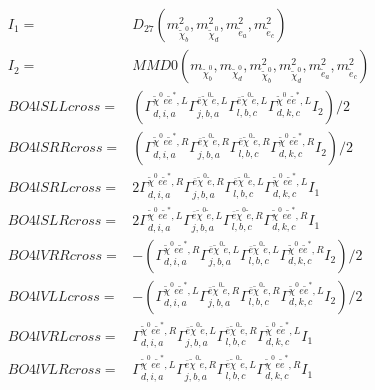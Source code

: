 \documentclass[A4,landscape]{article}
\begin{document}
\begin{align} 
I_1 = & D_{27}(m^2_{\tilde{\chi}^0_{{b}}}, m^2_{\tilde{\chi}^0_{{d}}}, m^2_{\tilde{e}_{{a}}}, m^2_{\tilde{e}_{{c}}}) \\ 
I_2 = & MMD0(m_{\tilde{\chi}^0_{{b}}}, m_{\tilde{\chi}^0_{{d}}}, m^2_{\tilde{\chi}^0_{{b}}}, m^2_{\tilde{\chi}^0_{{d}}}, m^2_{\tilde{e}_{{a}}}, m^2_{\tilde{e}_{{c}}}) \\ 
  BO4lSLLcross= & ( \Gamma^{\tilde{\chi}^0 e \tilde{e}^*,L}_{d, i, a} \Gamma^{\bar{e}\tilde{\chi}^0 \tilde{e} ,L}_{j, b, a} \Gamma^{\bar{e}\tilde{\chi}^0 \tilde{e} ,L}_{l, b, c} \Gamma^{\tilde{\chi}^0 e \tilde{e}^*,L}_{d, k, c} I_2)/2 \\ 
  BO4lSRRcross= & ( \Gamma^{\tilde{\chi}^0 e \tilde{e}^*,R}_{d, i, a} \Gamma^{\bar{e}\tilde{\chi}^0 \tilde{e} ,R}_{j, b, a} \Gamma^{\bar{e}\tilde{\chi}^0 \tilde{e} ,R}_{l, b, c} \Gamma^{\tilde{\chi}^0 e \tilde{e}^*,R}_{d, k, c} I_2)/2 \\ 
  BO4lSRLcross= & 2  \Gamma^{\tilde{\chi}^0 e \tilde{e}^*,R}_{d, i, a} \Gamma^{\bar{e}\tilde{\chi}^0 \tilde{e} ,R}_{j, b, a} \Gamma^{\bar{e}\tilde{\chi}^0 \tilde{e} ,L}_{l, b, c} \Gamma^{\tilde{\chi}^0 e \tilde{e}^*,L}_{d, k, c} I_1 \\ 
  BO4lSLRcross= & 2  \Gamma^{\tilde{\chi}^0 e \tilde{e}^*,L}_{d, i, a} \Gamma^{\bar{e}\tilde{\chi}^0 \tilde{e} ,L}_{j, b, a} \Gamma^{\bar{e}\tilde{\chi}^0 \tilde{e} ,R}_{l, b, c} \Gamma^{\tilde{\chi}^0 e \tilde{e}^*,R}_{d, k, c} I_1 \\ 
  BO4lVRRcross= & -( \Gamma^{\tilde{\chi}^0 e \tilde{e}^*,R}_{d, i, a} \Gamma^{\bar{e}\tilde{\chi}^0 \tilde{e} ,L}_{j, b, a} \Gamma^{\bar{e}\tilde{\chi}^0 \tilde{e} ,L}_{l, b, c} \Gamma^{\tilde{\chi}^0 e \tilde{e}^*,R}_{d, k, c} I_2)/2 \\ 
  BO4lVLLcross= & -( \Gamma^{\tilde{\chi}^0 e \tilde{e}^*,L}_{d, i, a} \Gamma^{\bar{e}\tilde{\chi}^0 \tilde{e} ,R}_{j, b, a} \Gamma^{\bar{e}\tilde{\chi}^0 \tilde{e} ,R}_{l, b, c} \Gamma^{\tilde{\chi}^0 e \tilde{e}^*,L}_{d, k, c} I_2)/2 \\ 
  BO4lVRLcross= &  \Gamma^{\tilde{\chi}^0 e \tilde{e}^*,R}_{d, i, a} \Gamma^{\bar{e}\tilde{\chi}^0 \tilde{e} ,L}_{j, b, a} \Gamma^{\bar{e}\tilde{\chi}^0 \tilde{e} ,R}_{l, b, c} \Gamma^{\tilde{\chi}^0 e \tilde{e}^*,L}_{d, k, c} I_1 \\ 
  BO4lVLRcross= &  \Gamma^{\tilde{\chi}^0 e \tilde{e}^*,L}_{d, i, a} \Gamma^{\bar{e}\tilde{\chi}^0 \tilde{e} ,R}_{j, b, a} \Gamma^{\bar{e}\tilde{\chi}^0 \tilde{e} ,L}_{l, b, c} \Gamma^{\tilde{\chi}^0 e \tilde{e}^*,R}_{d, k, c} I_1 \\ 

\end{align}
\end{document}
